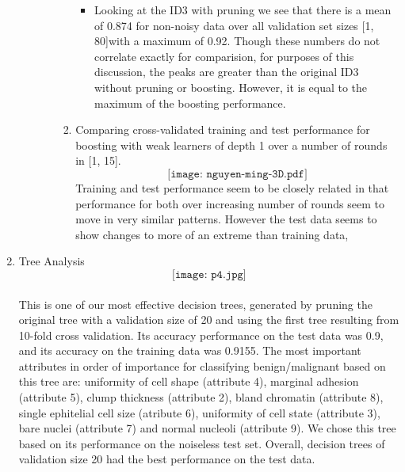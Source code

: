 \documentclass[11pt]{article}
\begin{document}
\begin{enumerate}
\begin{enumerate}
\begin{enumerate}
\begin{enumerate}
\begin{itemize}
			\item Looking at the ID3 with pruning we see that there is a mean of 0.874 for non-noisy data over all validation set sizes [1, 80]with a maximum of 0.92. Though these numbers do not correlate exactly for comparision, for purposes of this discussion, the peaks are greater than the original ID3 without pruning or boosting. However, it is equal to the maximum of the boosting performance.
			\end{itemize}
			\item Comparing cross-validated training and test performance for boosting with weak learners of depth 1 over a number of rounds in [1, 15].
			$$\texttt{[image: nguyen-ming-3D.pdf]}$$
			Training and test performance seem to be closely related in that performance for both over increasing number of rounds seem to move in very similar patterns. However the test data seems to show changes to more of an extreme than training data, 
		\end{enumerate}
	\end{enumerate}
\end{enumerate}

\item Tree Analysis
$$\texttt{[image: p4.jpg]}$$
\\ This is one of our most effective decision trees, generated by pruning the original tree with a validation size of 20 and using the first tree resulting from 10-fold cross validation. Its accuracy performance on the test data was 0.9, and its accuracy on the training data was 0.9155. The most important attributes in order of importance for classifying benign/malignant based on this tree are: uniformity of cell shape (attribute 4), marginal adhesion (attribute 5), clump thickness (attribute 2), bland chromatin (attribute 8), single ephitelial cell size (atribute 6), uniformity of cell state (attribute 3), bare nuclei (attribute 7) and normal nucleoli (attribute 9). We chose this tree based on its performance on the noiseless test set. Overall, decision trees of validation size 20 had the best performance on the test data.

\end{enumerate}
\end{document}
